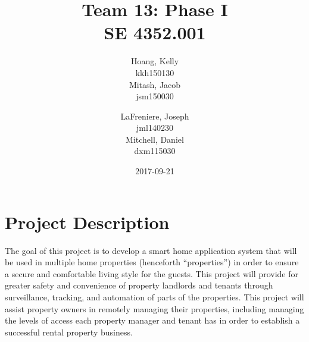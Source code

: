 \documentclass[letter,titlepage,oneside,english]{report}
\title{
  Team 13: Phase I\\
  SE 4352.001
}
\author{%
  Hoang, Kelly\\
  kkh150130\\[3ex]
  Mitash, Jacob\\
  jsm150030
  \and
  LaFreniere, Joseph\\
  jml140230\\[3ex]
  Mitchell, Daniel\\
  dxm115030
}
\date{2017-09-21}
\begin{document}
\maketitle{}

\section*{Project Description}
The goal of this project is to develop a smart home application system that will be used in multiple home properties (henceforth \enquote{properties}) in order to ensure a secure and comfortable living style for the guests.
This project will provide for greater safety and convenience of property landlords and tenants through surveillance, tracking, and automation of parts of the properties.
This project will assist property owners in remotely managing their properties, including managing the levels of access each property manager and tenant has in order to establish a successful rental property business.
\end{document}
